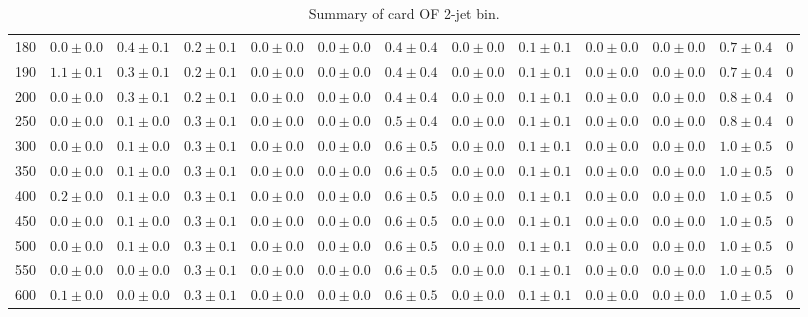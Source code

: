\begin{table}
{\begin{center}
\begin{tabular}{l | c c | c c c c c c c c  | c c}
180 & $0.0\pm0.0$ & $0.4\pm0.1$ & $0.2\pm0.1$ & $0.0\pm0.0$ & $0.0\pm0.0$ & $0.4\pm0.4$ & $0.0\pm0.0$ & $0.1\pm0.1$ & $0.0\pm0.0$ & $0.0\pm0.0$ & $0.7\pm0.4$ & 0 \\
190 & $1.1\pm0.1$ & $0.3\pm0.1$ & $0.2\pm0.1$ & $0.0\pm0.0$ & $0.0\pm0.0$ & $0.4\pm0.4$ & $0.0\pm0.0$ & $0.1\pm0.1$ & $0.0\pm0.0$ & $0.0\pm0.0$ & $0.7\pm0.4$ & 0 \\
200 & $0.0\pm0.0$ & $0.3\pm0.1$ & $0.2\pm0.1$ & $0.0\pm0.0$ & $0.0\pm0.0$ & $0.4\pm0.4$ & $0.0\pm0.0$ & $0.1\pm0.1$ & $0.0\pm0.0$ & $0.0\pm0.0$ & $0.8\pm0.4$ & 0 \\
250 & $0.0\pm0.0$ & $0.1\pm0.0$ & $0.3\pm0.1$ & $0.0\pm0.0$ & $0.0\pm0.0$ & $0.5\pm0.4$ & $0.0\pm0.0$ & $0.1\pm0.1$ & $0.0\pm0.0$ & $0.0\pm0.0$ & $0.8\pm0.4$ & 0 \\
300 & $0.0\pm0.0$ & $0.1\pm0.0$ & $0.3\pm0.1$ & $0.0\pm0.0$ & $0.0\pm0.0$ & $0.6\pm0.5$ & $0.0\pm0.0$ & $0.1\pm0.1$ & $0.0\pm0.0$ & $0.0\pm0.0$ & $1.0\pm0.5$ & 0 \\
350 & $0.0\pm0.0$ & $0.1\pm0.0$ & $0.3\pm0.1$ & $0.0\pm0.0$ & $0.0\pm0.0$ & $0.6\pm0.5$ & $0.0\pm0.0$ & $0.1\pm0.1$ & $0.0\pm0.0$ & $0.0\pm0.0$ & $1.0\pm0.5$ & 0 \\
400 & $0.2\pm0.0$ & $0.1\pm0.0$ & $0.3\pm0.1$ & $0.0\pm0.0$ & $0.0\pm0.0$ & $0.6\pm0.5$ & $0.0\pm0.0$ & $0.1\pm0.1$ & $0.0\pm0.0$ & $0.0\pm0.0$ & $1.0\pm0.5$ & 0 \\
450 & $0.0\pm0.0$ & $0.1\pm0.0$ & $0.3\pm0.1$ & $0.0\pm0.0$ & $0.0\pm0.0$ & $0.6\pm0.5$ & $0.0\pm0.0$ & $0.1\pm0.1$ & $0.0\pm0.0$ & $0.0\pm0.0$ & $1.0\pm0.5$ & 0 \\
500 & $0.0\pm0.0$ & $0.1\pm0.0$ & $0.3\pm0.1$ & $0.0\pm0.0$ & $0.0\pm0.0$ & $0.6\pm0.5$ & $0.0\pm0.0$ & $0.1\pm0.1$ & $0.0\pm0.0$ & $0.0\pm0.0$ & $1.0\pm0.5$ & 0 \\
550 & $0.0\pm0.0$ & $0.0\pm0.0$ & $0.3\pm0.1$ & $0.0\pm0.0$ & $0.0\pm0.0$ & $0.6\pm0.5$ & $0.0\pm0.0$ & $0.1\pm0.1$ & $0.0\pm0.0$ & $0.0\pm0.0$ & $1.0\pm0.5$ & 0 \\
600 & $0.1\pm0.0$ & $0.0\pm0.0$ & $0.3\pm0.1$ & $0.0\pm0.0$ & $0.0\pm0.0$ & $0.6\pm0.5$ & $0.0\pm0.0$ & $0.1\pm0.1$ & $0.0\pm0.0$ & $0.0\pm0.0$ & $1.0\pm0.5$ & 0 \\
\hline
\end{tabular}
\end{center}
}
\caption{Summary of card OF 2-jet bin.}
\end{table}

